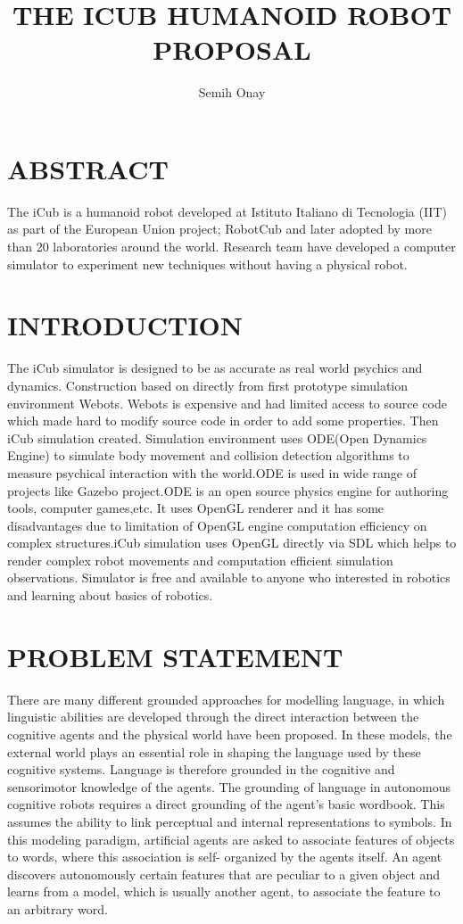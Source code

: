 \documentclass[12pt]{report}
\title{THE ICUB HUMANOID ROBOT \\ PROPOSAL}
\author{Semih Onay}
\begin{document}
\makecstitle

\chapter*{ABSTRACT}
The iCub is a humanoid robot developed at Istituto Italiano di Tecnologia (IIT) as part of the European Union project; RobotCub and later adopted by more than 20 laboratories around the world. Research team have developed a computer simulator to experiment new techniques without having a physical robot.\cite{iCub}

\chapter{INTRODUCTION}
The iCub simulator is designed to be as accurate as real world psychics and dynamics. Construction based on directly from first prototype simulation environment Webots\cite{webots}. Webots is expensive and had limited access to source code which made hard to modify source code in order to add some properties. Then iCub simulation created. Simulation environment uses ODE(Open Dynamics Engine)\cite{ode} to simulate body movement and collision detection algorithms to measure psychical interaction with the world.ODE is used in wide range of projects like Gazebo project.\cite{gazebo}ODE is an open source physics engine for authoring tools, computer games,etc. It uses OpenGL renderer and it has some disadvantages due to limitation of OpenGL engine computation efficiency on complex structures.iCub simulation uses OpenGL directly via SDL which helps to render complex robot movements and computation efficient simulation observations.\cite{sdl} Simulator is free and available to anyone who interested in robotics and learning about basics of robotics.\newpage

\chapter{PROBLEM STATEMENT}

There are many different grounded approaches for modelling language, in which linguistic abilities are developed through the direct interaction between the cognitive agents and the physical world have been proposed. In these models, the external world plays an essential role in shaping the language used by these cognitive systems. Language is therefore grounded in the cognitive and sensorimotor knowledge of the agents.\cite{cag} The grounding of language in autonomous cognitive robots requires a direct grounding of the agent’s basic wordbook. This assumes the ability to link perceptual and internal representations to symbols. In this modeling paradigm, artificial agents are asked to associate features of objects to words, where this association is self- organized by the agents itself. An agent discovers autonomously certain features that are peculiar to a given object and learns from a model, which is usually another agent, to associate the feature to an arbitrary word.
\end{document}
